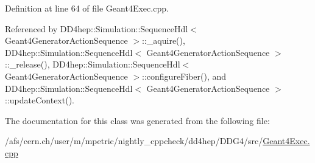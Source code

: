Definition at line 64 of file Geant4Exec.cpp.

Referenced by DD4hep::Simulation::SequenceHdl$<$ Geant4GeneratorActionSequence $>$::\_\-aquire(), DD4hep::Simulation::SequenceHdl$<$ Geant4GeneratorActionSequence $>$::\_\-release(), DD4hep::Simulation::SequenceHdl$<$ Geant4GeneratorActionSequence $>$::configureFiber(), and DD4hep::Simulation::SequenceHdl$<$ Geant4GeneratorActionSequence $>$::updateContext().

The documentation for this class was generated from the following file:\begin{DoxyCompactItemize}
\item 
/afs/cern.ch/user/m/mpetric/nightly\_\-cppcheck/dd4hep/DDG4/src/\hyperlink{_geant4_exec_8cpp}{Geant4Exec.cpp}\end{DoxyCompactItemize}
